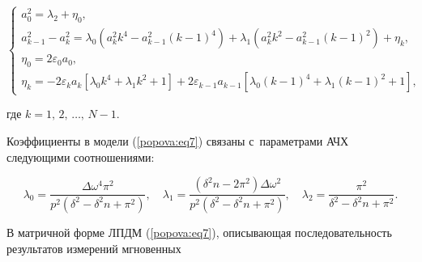 \begin{equation}


\label{popova:eq7}


\left\{ {\begin{array}{l}


 a_0^2 = \lambda _2 + \eta _0 , \\ 


 a_{k - 1}^2 - a_k^2 = \lambda _0 \left( {a_k^2 k^4 - a_{k - 1}^2 (k - 1)^4} 


\right) + \lambda _1 \left( {a_k^2 k^2 - a_{k - 1}^2 (k - 1)^2} \right) + 


\eta _k , \\ 


 \eta _0 = 2\varepsilon _0 a_0 , \\ 


 \eta _k = - 2\varepsilon _k a_k \left[ {\lambda _0 k^4 + \lambda _1 k^2 + 


1} \right] + 2\varepsilon _{k - 1} a_{k - 1} \left[ {\lambda _0 (k - 1)^4 + 


\lambda _1 (k - 1)^2 + 1} \right],


 \end{array}} \right.


\end{equation}


где $k = 1,\,2,\,\dots,\, N - 1.$





Коэффициенты в модели (\ref{popova:eq7}) связаны с~параметрами АЧХ следующими соотношениями:


\begin{equation}


\label{popova:eq8}


\lambda _0 = \frac{\Delta \omega ^4\pi ^2}{p^2\left( {\delta ^2 - \delta ^2n 


+ \pi ^2} \right)},


\quad


\lambda _1 = \frac{\left( {\delta ^2n - 2\pi ^2} \right)\Delta \omega 


^2}{p^2\left( {\delta ^2 - \delta ^2n + \pi ^2} \right)},


\quad


\lambda _2 = \frac{\pi ^2}{\delta ^2 - \delta ^2n + \pi ^2}.


\end{equation}





В матричной форме ЛПДМ (\ref{popova:eq7}), описывающая последовательность результатов измерений мгновенных 



